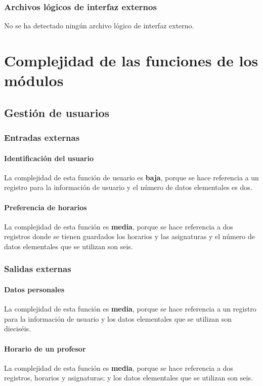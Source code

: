 \documentclass[11pt,a4paper,spanish,twoside]{book}
\begin{document}
\subsection{Archivos lógicos de interfaz externos}
No se ha detectado ningún archivo lógico de interfaz externo.

\chapter{Complejidad de las funciones de los  módulos} \label{cap:com}
\section{Gestión de usuarios}
\subsection{Entradas externas}
\subsubsection{Identificación del usuario}
La complejidad de esta función de usuario es \textbf{baja}, porque se hace
referencia a un registro para la información de usuario y el número de datos
elementales es dos. 

\subsubsection{Preferencia de horarios} 
La complejidad de esta función es \textbf{media}, porque se hace
referencia a dos registros donde se tienen guardados los horarios y las
asignaturas y el número de datos elementales que se utilizan son seis. 

\subsection{Salidas externas}
\subsubsection{Datos personales}
La complejidad de esta función es \textbf{media}, porque se hace referencia a
un registro para la información de usuario y los datos elementales que se
utilizan son dieciséis.

\subsubsection{Horario de un profesor}
La complejidad de esta función es \textbf{media}, porque se hace referencia a
dos registros, horarios y asignaturas; y los datos elementales que
se utilizan son seis.
\end{document}
